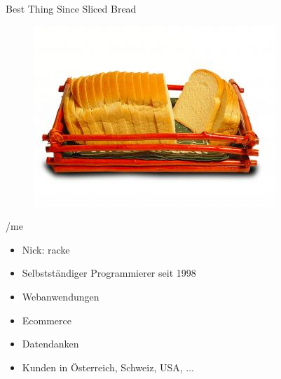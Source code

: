 \begin{frame}{Best Thing Since Sliced Bread}


\begin{figure}[!ht]
\centering
\includegraphics[width=1\linewidth]{img/sliced-bread.jpg}
\end{figure}
\end{frame}



\begin{frame}{/me}
\begin{itemize}
\item Nick: racke
\item Selbstständiger Programmierer seit 1998
\item Webanwendungen
\item Ecommerce
\item Datendanken
\item Kunden in Österreich, Schweiz, USA, ...
\end{itemize}
\end{frame}


